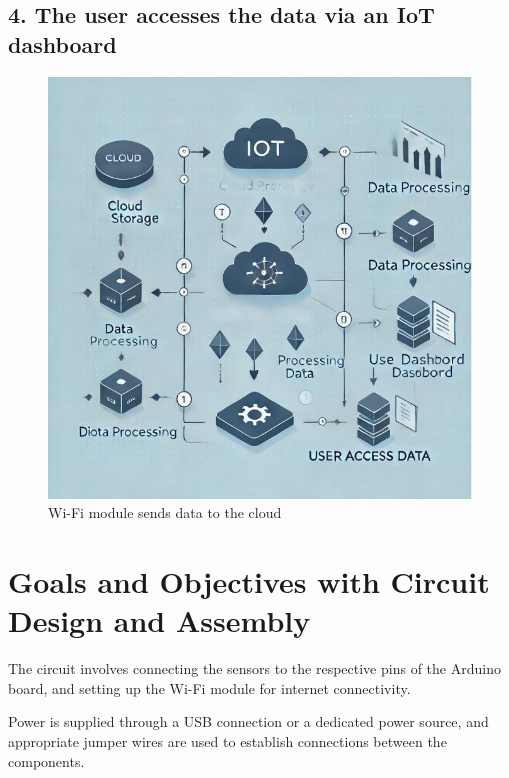 \documentclass[12pt]{report}
\begin{document}
	\subsection*{4. The user accesses the data via an IoT dashboard}
	\begin{figure}[ht]
		\centering
		\includegraphics[scale=1]{useraccess.jpg}
		\caption[user_access]{Wi-Fi module sends data to the cloud}
		\label{user_access}
	\end{figure}
	\clearpage
	
	\section{Goals and Objectives with Circuit Design and Assembly}
	The circuit involves connecting the sensors to the respective pins of the Arduino board, and
	setting up the Wi-Fi module for internet connectivity.
	
	\vspace{0.5cm}
	Power is supplied through a USB connection or a dedicated power source, and appropriate
	jumper wires are used to establish connections between the components.
	
\end{document}
